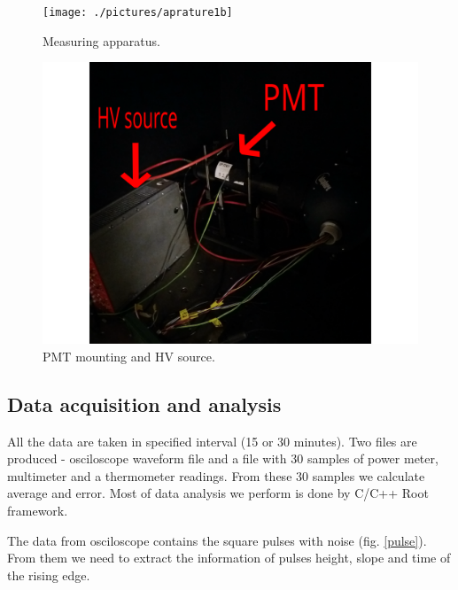 \begin{figure}[H]
 \centering
 \texttt{[image: ./pictures/aprature1b]}
 \caption{Measuring apparatus.}
 \label{aparature1}
\end{figure}

\begin{figure}[H]
 \centering
 \includegraphics[scale = 0.09]{./pictures/aparature2b}
 \caption{PMT mounting and HV source.}
 \label{aparature2}
\end{figure}


\subsection{Data acquisition and analysis}
All the data are taken in specified interval (15 or 30 minutes). Two files are produced - osciloscope waveform file and a file with 30 samples of power meter, multimeter and a thermometer readings. From these 30 samples we calculate average and error. Most of data analysis we perform is done by C/C++ Root framework.
\par
The data from osciloscope contains the square pulses with noise (fig. \ref{pulse}). From them we need to extract the information of pulses height, slope and time of the rising edge.


